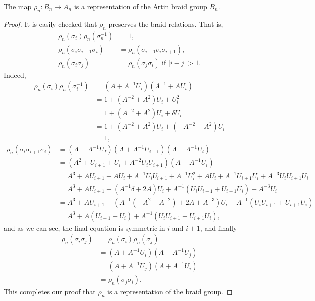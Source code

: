 \begin{theorem}
The map $\rho_n: B_n \to A_n$ is a representation of the Artin braid group $B_n$.
\end{theorem}
\begin{proof}
It is easily checked that $\rho_n$ preserves the braid relations. That is, 
\begin{align*}
  \rho_n(\sigma_i)\rho_n(\sigma^{-1}_n) &= 1, \\
  \rho_n(\sigma_i\sigma_{i+1}\sigma_i) &= \rho_n(\sigma_{i+1}\sigma_i\sigma_{i+1}), \\
  \rho_n(\sigma_i\sigma_j) &= \rho_n(\sigma_j\sigma_i) \text{ if } |i-j|>1.
\end{align*}
Indeed, 
\begin{align*}
  \rho_n(\sigma_i)\rho_n(\sigma_i^{-1}) &= (A+A^{-1}U_i)(A^{-1} + AU_i) \\
                                        &= 1 + (A^{-2} + A^2)U_i + U_i^2 \\
                                        &= 1 + (A^{-2} + A^2)U_i + \delta U_i \\
                                        &= 1 + (A^{-2} + A^2)U_i + (-A^{-2} - A^2)U_i \\
  &= 1,
\end{align*}
\begin{align*}
  \rho_n(\sigma_i\sigma_{i+1}\sigma_i) &= (A+A^{-1}U_I)(A + A^{-1}U_{i+1})(A + A^{-1}U_i) \\
                                       &= (A^2 + U_{i+1} + U_i + A^{-2}U_iU_{i+1})(A + A^{-1}U_i) \\
                                       &= A^3 + AU_{i+1} + AU_i + A^{-1}U_iU_{i+1} + A^{-1}U_i^2 + AU_i + A^{-1}U_{i+1}U_i + A^{-3}U_iU_{i+1}U_i \\
                                       &= A^3 + AU_{i+1} + (A^{-1}\delta + 2A)U_i + A^{-1}(U_iU_{i+1} + U_{i+1}U_i) + A^{-3}U_i \\
                                       &= A^3 + AU_{i+1} + (A^{-1}(-A^2 - A^{-2}) + 2A + A^{-3})U_i + A^{-1}(U_iU_{i+1} + U_{i+1}U_i) \\
  &= A^3 + A(U_{i+1} + U_i) + A^{-1}(U_iU_{i+1} + U_{i+1}U_i),
\end{align*}
and as we can see, the final equation is symmetric in $i$ and $i+1$, and finally 
\begin{align*}
  \rho_n(\sigma_i\sigma_j) &= \rho_n(\sigma_i)\rho_n(\sigma_{j}) \\
                           &= (A+A^{-1}U_i)(A + A^{-1}U_j) \\
                           &= (A + A^{-1}U_j)(A + A^{-1}U_i) \\
  &= \rho_n(\sigma_j\sigma_i).
\end{align*}
This completes our proof that $\rho_n$ is a representation of the braid group.
\end{proof}

